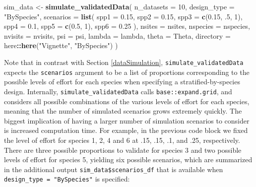\documentclass[
]{article}
\newenvironment{Shaded}{\begin{snugshade}}{\end{snugshade}}
\newcommand{\AttributeTok}[1]{\textcolor[rgb]{0.13,0.29,0.53}{#1}}
\newcommand{\DecValTok}[1]{\textcolor[rgb]{0.00,0.00,0.81}{#1}}
\newcommand{\FloatTok}[1]{\textcolor[rgb]{0.00,0.00,0.81}{#1}}
\newcommand{\FunctionTok}[1]{\textcolor[rgb]{0.13,0.29,0.53}{\textbf{#1}}}
\newcommand{\NormalTok}[1]{#1}
\newcommand{\OtherTok}[1]{\textcolor[rgb]{0.56,0.35,0.01}{#1}}
\newcommand{\SpecialCharTok}[1]{\textcolor[rgb]{0.81,0.36,0.00}{\textbf{#1}}}
\newcommand{\StringTok}[1]{\textcolor[rgb]{0.31,0.60,0.02}{#1}}
\begin{document}
\begin{Shaded}
\begin{Highlighting}[]
\NormalTok{sim\_data }\OtherTok{\textless{}{-}} \FunctionTok{simulate\_validatedData}\NormalTok{(}
  \AttributeTok{n\_datasets =} \DecValTok{10}\NormalTok{, }
  \AttributeTok{design\_type =} \StringTok{"BySpecies"}\NormalTok{,}
  \AttributeTok{scenarios =} \FunctionTok{list}\NormalTok{(}
    \AttributeTok{spp1 =} \FloatTok{0.15}\NormalTok{, }
    \AttributeTok{spp2 =} \FloatTok{0.15}\NormalTok{, }
    \AttributeTok{spp3 =} \FunctionTok{c}\NormalTok{(}\FloatTok{0.15}\NormalTok{, .}\DecValTok{5}\NormalTok{, }\DecValTok{1}\NormalTok{),}
    \AttributeTok{spp4 =} \FloatTok{0.1}\NormalTok{, }
    \AttributeTok{spp5 =} \FunctionTok{c}\NormalTok{(}\FloatTok{0.5}\NormalTok{, }\DecValTok{1}\NormalTok{),}
    \AttributeTok{spp6 =} \FloatTok{0.25}
\NormalTok{  ),}
  \AttributeTok{nsites =}\NormalTok{ nsites, }
  \AttributeTok{nspecies =}\NormalTok{ nspecies, }
  \AttributeTok{nvisits =}\NormalTok{ nvisits,}
  \AttributeTok{psi =}\NormalTok{ psi, }
  \AttributeTok{lambda =}\NormalTok{ lambda, }
  \AttributeTok{theta =}\NormalTok{ Theta, }
  \AttributeTok{directory =}\NormalTok{ here}\SpecialCharTok{::}\FunctionTok{here}\NormalTok{(}\StringTok{"Vignette"}\NormalTok{, }\StringTok{"BySpecies"}\NormalTok{)}
\NormalTok{)}
\end{Highlighting}
\end{Shaded}

\linespread{1}

Note that in contrast with Section \ref{dataSimulation}, \texttt{simulate\_validatedData} expects the \texttt{scenarios} argument to be a list of proportions corresponding to the possible levels of effort for each species when specifying a stratified-by-species design. Internally, \texttt{simulate\_validatedData} calls \texttt{base::expand.grid}, and considers all possible combinations of the various levels of effort for each species, meaning that the number of simulated scenarios grows extremely quickly. The biggest implication of having a larger number of simulation scenarios to consider is increased computation time. For example, in the previous code block we fixed the level of effort for species 1, 2, 4 and 6 at .15, .15, .1, and .25, respectively. There are three possible proportions to validate for species 3 and two possible levels of effort for species 5, yielding six possible scenarios, which are summarized in the additional output \texttt{sim\_data\$scenarios\_df} that is available when \texttt{design\_type\ =\ "BySpecies"} is specified:
\end{document}
